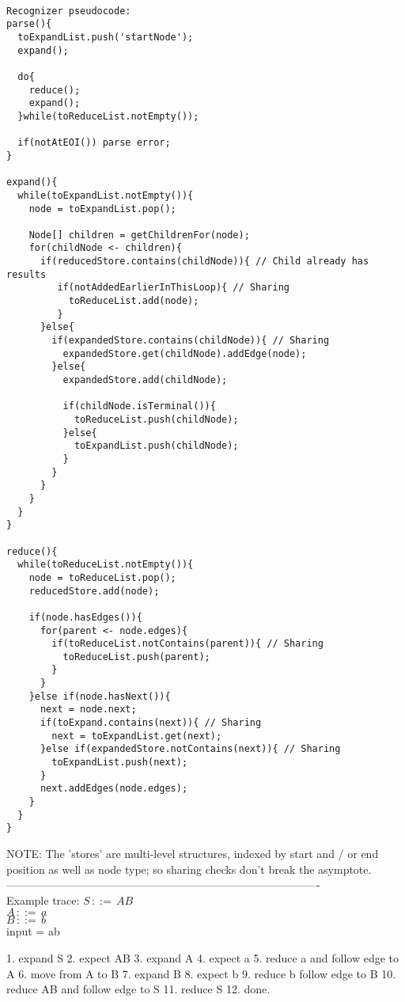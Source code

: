\documentclass[a4paper,10pt]{article}
\begin{document}
\begin{verbatim}

Recognizer pseudocode:
parse(){
  toExpandList.push('startNode');
  expand();
  
  do{
    reduce();
    expand();
  }while(toReduceList.notEmpty());
  
  if(notAtEOI()) parse error;
}

expand(){
  while(toExpandList.notEmpty()){
    node = toExpandList.pop();
    
    Node[] children = getChildrenFor(node);
    for(childNode <- children){
      if(reducedStore.contains(childNode)){ // Child already has results
         if(notAddedEarlierInThisLoop){ // Sharing
           toReduceList.add(node);
         }
      }else{
        if(expandedStore.contains(childNode)){ // Sharing
          expandedStore.get(childNode).addEdge(node);
        }else{
          expandedStore.add(childNode);
          
          if(childNode.isTerminal()){
            toReduceList.push(childNode);
          }else{
            toExpandList.push(childNode);
          }
        }
      }
    }
  }
}

reduce(){
  while(toReduceList.notEmpty()){
    node = toReduceList.pop();
    reducedStore.add(node);
    
    if(node.hasEdges()){
      for(parent <- node.edges){
        if(toReduceList.notContains(parent)){ // Sharing
          toReduceList.push(parent);
        }
      }
    }else if(node.hasNext()){
      next = node.next;
      if(toExpand.contains(next)){ // Sharing
        next = toExpandList.get(next);
      }else if(expandedStore.notContains(next)){ // Sharing
        toExpandList.push(next);
      }
      next.addEdges(node.edges);
    }
  }
}
\end{verbatim}

NOTE: The 'stores' are multi-level structures, indexed by start and / or end position as well as node type; so sharing checks don't break the asymptote.\\

-------------------------------------------------------------------------------------\\

Example trace:
$S\,::=\,AB$\\
$A\,::=\,a$\\
$B\,::=\,b$\\
input = ab

1. expand S
2. expect AB
3. expand A
4. expect a
5. reduce a and follow edge to A
6. move from A to B
7. expand B
8. expect b
9. reduce b follow edge to B
10. reduce AB and follow edge to S
11. reduce S
12. done.
\end{document}
